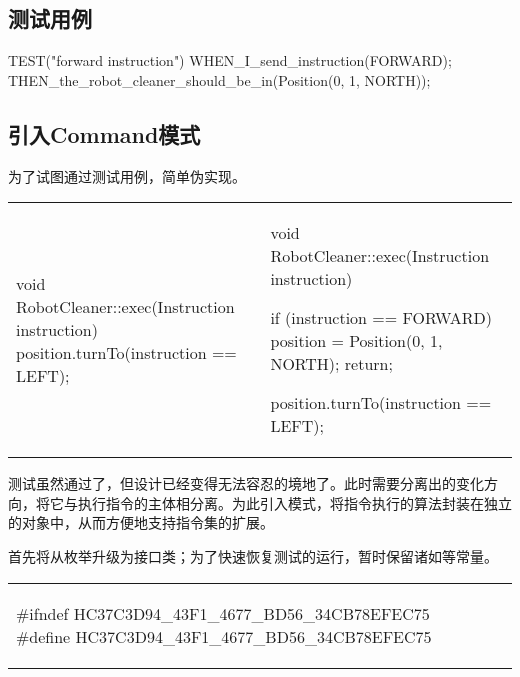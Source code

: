 \begin{content}

\subsection{测试用例}

\begin{leftbar}
\begin{c++}[caption={test/robot-cleaner/TestRobotCleaner.h}]
TEST("forward instruction")
{
    WHEN_I_send_instruction(FORWARD);
    THEN_the_robot_cleaner_should_be_in(Position(0, 1, NORTH));
}
\end{c++}
\end{leftbar}

\subsection{引入Command模式}

为了试图通过测试用例，简单伪实现。

\begin{tabular}{@{}p{} 
                 | p{}@{}}
\begin{c++}[caption={src/robot-cleaner/RobotCleaner.cpp}]
void RobotCleaner::exec(Instruction instruction)
{
    position.turnTo(instruction == LEFT);
}
\end{c++}
&
\begin{c++}[caption={src/robot-cleaner/RobotCleaner.cpp}]
void RobotCleaner::exec(Instruction instruction)
{
    if (instruction == FORWARD)
    {
        position = Position(0, 1, NORTH);
        return;
    }

    position.turnTo(instruction == LEFT);
}
\end{c++}
\end{tabular}

测试虽然通过了，但设计已经变得无法容忍的境地了。此时需要分离出的变化方向，将它与执行指令的主体相分离。为此引入模式，将指令执行的算法封装在独立的对象中，从而方便地支持指令集的扩展。

首先将从枚举升级为接口类；为了快速恢复测试的运行，暂时保留诸如等常量。

\begin{tabular}{@{}p{} 
                 | p{}@{}}
\begin{c++}[caption={include/robot-cleaner/Instruction.h}]
#ifndef HC37C3D94_43F1_4677_BD56_34CB78EFEC75
#define HC37C3D94_43F1_4677_BD56_34CB78EFEC75


\end{c++}
\end{tabular}
\end{content}
